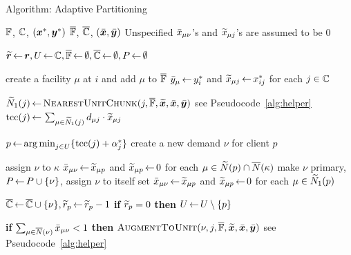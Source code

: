 \documentclass[oneside,final]{ucr}
\def\ssp{\def\baselinestretch{1.0}\large\normalsize}
\begin{document}
\ssp
\begin{algorithm}[ht]
  \caption{Algorithm: Adaptive Partitioning}
  \label{alg:lpr2}
  \begin{algorithmic}[1]
    \Require $\mathbb{F}$, $\mathbb{C}$, $(\boldsymbol{x}^\ast,\boldsymbol{y}^\ast)$
    \Ensure  $\overline{\mathbb{F}}$,  $\overline{\mathbb{C}}$, $(\bar{\boldsymbol{x}}, \bar{\boldsymbol{y}})$ 
    \Comment Unspecified ${\bar x}_{\mu \nu}$'s and ${\widetilde x}_{\mu j}$'s are assumed to be $0$

    \State $\widetilde{\boldsymbol{r}} {\,\leftarrow\,} \boldsymbol{r}, U{\,\leftarrow\,} \mathbb{C}, \overline{\mathbb{F}}{\,\leftarrow\,} \emptyset,
    \overline{\mathbb{C}}{\,\leftarrow\,} \emptyset, P{\,\leftarrow\,} \emptyset$

    \State create a facility $\mu$ at $i$ and add $\mu$ to $\overline{\mathbb{F}}$
    \State ${\bar y}_\mu {\,\leftarrow\,} y_i^\ast$ and ${\widetilde x}_{\mu j}{\,\leftarrow\,}
    x_{ij}^\ast$ for each $j\in\mathbb{C}$ 
    \EndFor

    \State ${\widetilde N}_1(j) {\,\leftarrow\,} {{\textsc{NearestUnitChunk}}}(j, \overline{\mathbb{F}}, \widetilde{\boldsymbol{x}}, \bar{\boldsymbol{x}}, \bar{\boldsymbol{y}})$ \Comment see Pseudocode~\ref{alg:helper}
    \State $\mbox{\rm{tcc}}(j){\,\leftarrow\,} \sum_{\mu\in {\widetilde N}_1(j)} d_{{\mu}j}\cdot {\widetilde x}_{\mu j}$
    \EndFor
 
    \State $p {\,\leftarrow\,} {\operatorname*{arg\,min}}_{j\in U}\{ \mbox{\rm{tcc}}(j)+\alpha_j^\ast \}$
    \State create a new demand $\nu$ for client $p$

    \State assign $\nu$ to $\kappa$
    \State ${\bar x}_{\mu \nu}{\,\leftarrow\,} {\widetilde x}_{\mu p}$ and ${\widetilde x}_{\mu p}{\,\leftarrow\,} 0$ for each $\mu \in {\widetilde N}(p) \cap {\overline{N}}(\kappa)$
    \Else 
    \State make $\nu$ primary, $P {\,\leftarrow\,} P \cup \{\nu\}$, assign $\nu$ to itself
    \State set ${\bar x}_{\mu\nu} {\,\leftarrow\,} {\widetilde x}_{\mu p}$ and ${\widetilde x}_{\mu p}{\,\leftarrow\,} 0$ for each $\mu\in {\widetilde N}_1(p)$

    \EndIf
    \State $\overline{\mathbb{C}}{\,\leftarrow\,} \overline{\mathbb{C}}\cup \{\nu\},
    {\widetilde r}_p {\,\leftarrow\,} {\widetilde r}_p -1$
	\State \textbf{if} {${\widetilde r}_p=0$} \textbf{then} $U{\,\leftarrow\,} U \setminus \{p\}$
    \EndWhile

     
        
    \State \textbf{if} $\sum_{\mu\in {\overline{N}}(\nu)}{\bar x}_{\mu\nu}<1$
    \textbf{then} ${\textsc{AugmentToUnit}}(\nu, j, \overline{\mathbb{F}}, \widetilde{\boldsymbol{x}}, \bar{\boldsymbol{x}}, \bar{\boldsymbol{y}})$ \Comment see Pseudocode~\ref{alg:helper}
    \EndFor
    \EndFor
  \end{algorithmic}
\end{algorithm}
\end{document}
